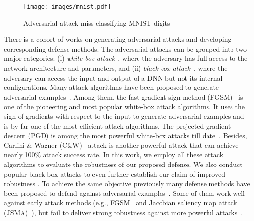 \documentclass{article}
\begin{document}
\begin{figure}[ht]
  \centering
   \texttt{[image: images/mnist.pdf]}
   \caption{Adversarial attack miss-classifying MNIST digits}
   \label{mnisti}
\end{figure}



There is a cohort of works on generating adversarial attacks and developing corresponding defense methods. The adversarial attacks can be grouped into two major categories: (i) \textit{white-box attack}~\cite{szegedy2013intriguing,carlini2017towards}, where the adversary has full access to the network architecture and parameters, and (ii) \textit{black-box attack}~\cite{liu2016delving,papernot2016transferability,chen2017zoo}, where the adversary can access the input and output of a DNN but not its internal configurations. Many attack algorithms have been proposed to generate adversarial examples~\cite{szegedy2013intriguing,kurakin2016adversarial,kos2017delving,papernot2016limitations,moosavi2016deepfool,athalye2018obfuscated,chen2017ead,carlini2017towards}. Among them, the fast gradient sign method (FGSM)~\cite{goodfellow2014explaining} is one of the pioneering and most popular white-box attack algorithms. It uses the sign of gradients with respect to the input to generate adversarial examples and is by far one of the most efficient attack algorithms. The projected gradient descent (PGD) is among the most powerful white-box attacks till date~\cite{madry2017towards}. Besides, Carlini \& Wagner (C\&W)~\cite{carlini2017towards} attack is another powerful attack that can achieve nearly 100\% attack success rate. In this work, we employ all these attack algorithms to evaluate the robustness of our proposed defense. We also conduct popular black box attacks to even further establish our claim of improved robustness \cite{chen2017zoo,papernot2017practical}. To achieve the same objective previously many defense methods have been proposed to defend against adversarial examples~\cite{gu2014towards,papernot2016distillation,papernot2016towards,xu2017feature}. Some of them work well against early attack methods (e.g., FGSM~\cite{goodfellow2014explaining} and Jacobian saliency map attack (JSMA)~\cite{papernot2016limitations}), but fail to deliver strong robustness against more powerful attacks~\cite{madry2017towards,carlini2017towards,athalye2018obfuscated}.
\end{document}
